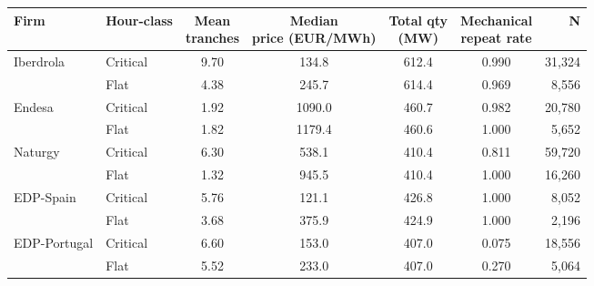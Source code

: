 \begin{tabular}{l l c c c c r}
\toprule
Firm & Hour-class & \makecell{Mean\\tranches} & \makecell{Median\\price (EUR/MWh)} & \makecell{Total qty\\(MW)} & \makecell{Mechanical\\repeat rate} & N \\
\midrule
Iberdrola & Critical & 9.70 & 134.8 & 612.4 & 0.990 & 31,324 \\
 & Flat & 4.38 & 245.7 & 614.4 & 0.969 & 8,556 \\
\addlinespace
Endesa & Critical & 1.92 & 1090.0 & 460.7 & 0.982 & 20,780 \\
 & Flat & 1.82 & 1179.4 & 460.6 & 1.000 & 5,652 \\
\addlinespace
Naturgy & Critical & 6.30 & 538.1 & 410.4 & 0.811 & 59,720 \\
 & Flat & 1.32 & 945.5 & 410.4 & 1.000 & 16,260 \\
\addlinespace
EDP-Spain & Critical & 5.76 & 121.1 & 426.8 & 1.000 & 8,052 \\
 & Flat & 3.68 & 375.9 & 424.9 & 1.000 & 2,196 \\
\addlinespace
EDP-Portugal & Critical & 6.60 & 153.0 & 407.0 & 0.075 & 18,556 \\
 & Flat & 5.52 & 233.0 & 407.0 & 0.270 & 5,064 \\
\bottomrule
\end{tabular}
